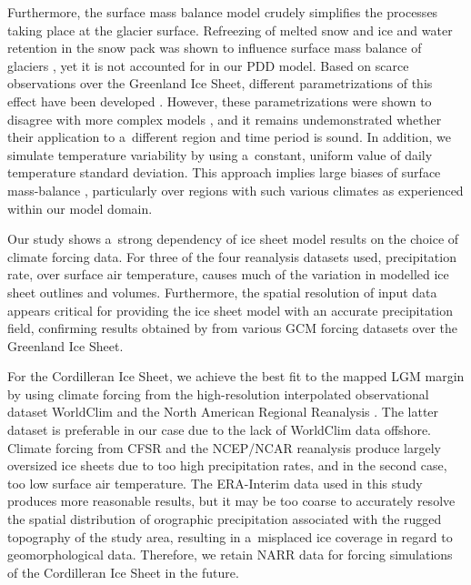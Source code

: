 \documentclass[tc, ms]{copernicus}
\begin{document}
Furthermore, the surface mass balance model crudely simplifies the processes taking place at the glacier surface. Refreezing of melted snow and ice and water retention in the snow pack was shown to influence surface mass balance of glaciers \citep{trabant-mayo-1985}, yet it is not accounted for in our PDD model. Based on scarce observations over the Greenland Ice Sheet, different parametrizations of this effect have been developed \citep{janssens-huybrechts-2000,fausto-etal-2009b}. However, these parametrizations were shown to disagree with more complex models \citep{reijmer-etal-2012}, and it remains undemonstrated whether their application to a~different region and time period is sound. In addition, we simulate temperature variability by using a~constant, uniform value of daily temperature standard deviation. This approach implies large biases of surface mass-balance \citep{charbit-etal-2013,rau-rogozhina-2013,seguinot-2013}, particularly over regions with such various climates as experienced within our model domain.

\conclusions
\label{sec:concl}

Our study shows a~strong dependency of ice sheet model results on the choice of climate forcing data. For three of the four reanalysis datasets used, precipitation rate, over surface air temperature, causes much of the variation in modelled ice sheet outlines and volumes. Furthermore, the spatial resolution of input data appears critical for providing the ice sheet model with an accurate precipitation field, confirming results obtained by \citet{quiquet-etal-2012} from various GCM forcing datasets over the Greenland Ice Sheet.

For the Cordilleran Ice Sheet, we achieve the best fit to the mapped LGM margin by \citet{dyke-2004} using climate forcing from the high-resolution interpolated observational dataset WorldClim \citep{data:worldclim} and the North American Regional Reanalysis \citep[NARR;][]{data:narr}. The latter dataset is preferable in our case due to the lack of WorldClim data offshore. Climate forcing from CFSR and the NCEP/NCAR reanalysis produce largely oversized ice sheets due to too high precipitation rates, and in the second case, too low surface air temperature. The ERA-Interim data used in this study produces more reasonable results, but it may be too coarse to accurately resolve the spatial distribution of orographic precipitation associated with the rugged topography of the study area, resulting in a~misplaced ice coverage in regard to geomorphological data. Therefore, we retain NARR data for forcing simulations of the Cordilleran Ice Sheet in the future.
\end{document}
